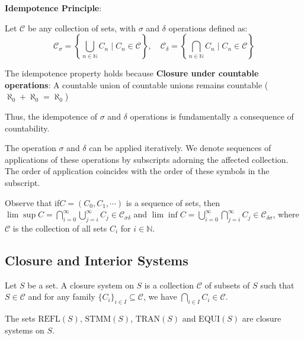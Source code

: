 \documentclass[../main.tex]{subfiles}
\begin{document}
\begin{green}
\textbf{Idempotence Principle}:

Let $\mathcal{C}$ be any collection of sets, with $\sigma$ and $\delta$ operations defined as:
$$
\mathcal{C}_\sigma = \left\{ \bigcup_{n\in\mathbb{N}} C_n \mid C_n \in \mathcal{C} \right\}, \quad 
\mathcal{C}_\delta = \left\{ \bigcap_{n\in\mathbb{N}} C_n \mid C_n \in \mathcal{C} \right\}
$$

The idempotence property holds because \textbf{Closure under countable operations}: A countable union of countable unions remains countable ($\aleph_0 + \aleph_0 = \aleph_0$)

Thus, the idempotence of $\sigma$ and $\delta$ operations is fundamentally a consequence of countability.
\end{green}

The operation $\sigma$ and $\delta$ can be applied iteratively. We denote sequences of applications of these operations by subscripts adorning the affected collection. The order of application coincides with the order of these symbols in the subscript.

\begin{green}
    
Observe that if$C=(C_0,C_1,\cdots)$ is a sequence of sets, then $\lim\sup C=\bigcap_{i=0}^\infty\bigcup_{j=i}^{\infty}C_j\in\mathcal{C}_{\sigma\delta}$ and $\lim\inf C=\bigcup_{i=0}^\infty\bigcap_{j=i}^{\infty}C_j\in\mathcal{C}_{\delta\sigma}$, where $\mathcal{C}$ is the collection of all sets $C_i$ for $i\in\mathbb{N}$.
\end{green}

\subsection{Closure and Interior Systems}

\begin{purple}
\begin{definition}
    
Let $S$ be a set. A closure system on $S$ is a collection $\mathcal{C}$ of subsets of $S$ such that $S\in\mathcal{C}$ and for any family $\{C_i\}_{i\in I}\subseteq \mathcal{C}$, we have $\bigcap_{i\in I}C_i\in\mathcal{C}$.
\end{definition}
\end{purple}

\begin{yellow}
\begin{theorem}

The sets $\text{REFL}(S)$, $\text{STMM}(S)$, $\text{TRAN}(S)$ and $\text{EQUI}(S)$ are closure systems on $S$.
\end{theorem}
\end{yellow}
\end{document}
